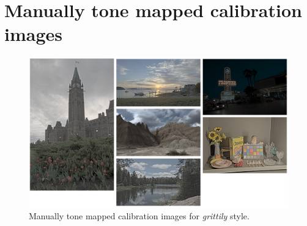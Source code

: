 \chapter{Manually tone mapped calibration images}
\label{app:calib}


\begin{figure}
\begin{center}
\includegraphics[width=\textwidth]{appendix2/calibimg_grittily.pdf}
\caption{Manually tone mapped calibration images for \emph{grittily} style.}
\end{center}
\end{figure}

